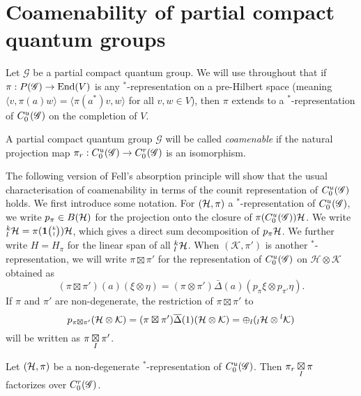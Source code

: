 \section{Coamenability of partial compact quantum groups}

Let $\mathscr{G}$ be a partial compact quantum group. We will use throughout that if $\pi: P(\mathscr{G}) \rightarrow \operatorname{\mathrm{End}}(V)$ is any $^*$-representation on a pre-Hilbert space (meaning $\langle v,\pi(a)w\rangle = \langle \pi(a^*)v,w\rangle$ for all $v,w\in V$), then $\pi$ extends to a $^*$-representation of $C^{u}_{0}(\mathscr{G})$ on the completion of $V$.

\begin{Def} A partial compact quantum group $\mathscr{G}$ will be called \emph{coamenable} if the natural projection map $\pi_r:C^{u}_{0}(\mathscr{G})\rightarrow C^{r}_{0}(\mathscr{G})$ is an isomorphism.
\end{Def}



The following version of Fell's absorption principle will show that the usual characterisation of coamenability in terms of the counit representation of $C^{u}_{0}(\mathscr{G})$ holds. We first introduce some notation. %
For $(\mathcal{H},\pi)$ a $^*$-representation of $C^{u}_{0}(\mathscr{G})$, we write $p_{\pi}\in B(\mathcal{H})$ for the projection onto the closure of $\pi(C^{u}_{0}(\mathscr{G}))\mathcal{H}$. We write ${}^{k}_{l}\mathcal{H} = \pi(\mathbf{1}{\tiny {\begin{pmatrix} k\\l\end{pmatrix}}})\mathcal{H}$, which gives a direct sum decomposition of $p_{\pi}\mathcal{H}$. We further write $H=H_{\pi}$ for the linear span of all ${}^{k}_{l}\mathcal{H}$. When $(\mathcal{K},\pi')$ is another $^*$-representation, we will write $\pi \boxtimes \pi'$ for the representation of $C^{u}_{0}(\mathscr{G})$ on $\mathcal{H}\otimes \mathcal{K}$ obtained as \[(\pi \boxtimes \pi')(a)(\xi\otimes \eta) = (\pi\otimes \pi')\bar{\Delta}(a)(p_{\pi}\xi\otimes p_{\pi'}\eta).\] If $\pi$ and $\pi'$ are non-degenerate, the restriction of $\pi\boxtimes \pi'$ to \[p_{\pi \boxtimes \pi'}(\mathcal{H}\otimes \mathcal{K}) = (\pi \boxtimes \pi')\overline{\Delta}(1)(\mathcal{H}\otimes \mathcal{K})= \oplus_l ({}_l\mathcal{H}\otimes {}^l\mathcal{K})\] will be written as $\pi\underset{I}{\boxtimes} \pi'$. 

\begin{Lem} Let $(\mathcal{H},\pi)$ be a non-degenerate $^*$-representation of $C^{u}_{0}(\mathscr{G})$. Then $\pi_r\underset{I}{\boxtimes} \pi$ factorizes over $C^{r}_{0}(\mathscr{G})$.
\end{Lem}


